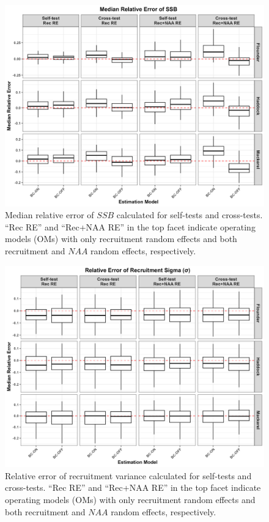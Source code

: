 \documentclass[
  12pt,
]{article}
\begin{document}
\begin{figure}[H]
\centering
\includegraphics[width=\textwidth]{Revised_Figures&Tables/Median_SSB.PNG}
\caption{Median relative error of $SSB$ calculated for self-tests and cross-tests. ``Rec RE'' and ``Rec+NAA RE'' in the top facet indicate operating models (OMs) with only recruitment random effects and both recruitment and $NAA$ random effects, respectively.}
\label{fig:Median_SSB}
\end{figure}

\begin{figure}[H]
\centering
\includegraphics[width=\textwidth]{Revised_Figures&Tables/Rec_sigma.PNG}
\caption{Relative error of recruitment variance calculated for self-tests and cross-tests. ``Rec RE'' and ``Rec+NAA RE'' in the top facet indicate operating models (OMs) with only recruitment random effects and both recruitment and $NAA$ random effects, respectively.}
\label{fig:Rec_sigma}
\end{figure}
\end{document}
